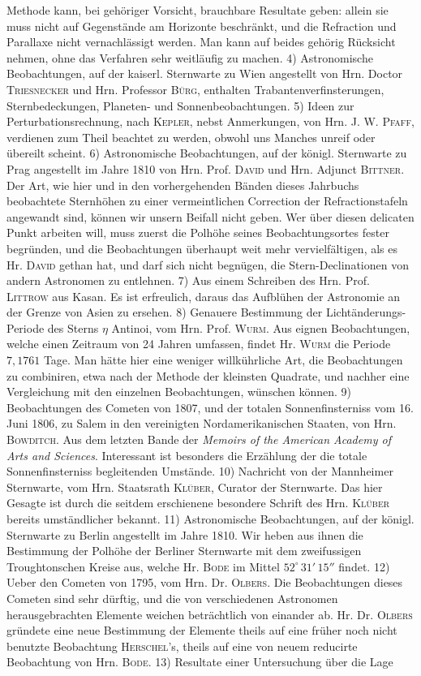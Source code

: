 \noindent Methode kann, bei gehöriger Vorsicht, brauchbare Resultate geben: allein sie muss nicht auf Gegenstände am Horizonte beschränkt, und die Refraction und Parallaxe nicht vernachlässigt werden. Man kann auf beides gehörig Rücksicht nehmen, ohne das Verfahren sehr weitläufig zu machen. 4) Astronomische Beobachtungen, auf der kaiserl. Sternwarte zu Wien angestellt von Hrn. Doctor \textsc{Triesnecker} und Hrn. Professor \textsc{Bürg}, enthalten Trabantenverfinsterungen, Sternbedeckungen, Planeten- und Sonnenbeobachtungen. 5) Ideen zur Perturbationsrechnung, nach \textsc{Kepler}, nebst Anmerkungen, von Hrn. J. W. \textsc{Pfaff}, verdienen zum Theil beachtet zu werden, obwohl uns Manches unreif oder übereilt scheint. 6) Astronomische Beobachtungen, auf der königl. Sternwarte zu Prag angestellt im Jahre 1810 von Hrn. Prof. \textsc{David} und Hrn. Adjunct \textsc{Bittner}. Der Art, wie hier und in den vorhergehenden Bänden dieses Jahrbuchs beobachtete Sternhöhen zu einer vermeintlichen Correction der Refractionstafeln angewandt sind, können wir unsern Beifall nicht geben. Wer über diesen delicaten Punkt arbeiten will, muss zuerst die Polhöhe seines Beobachtungsortes fester begründen, und die Beobachtungen überhaupt weit mehr vervielfältigen, als es Hr. \textsc{David} gethan hat, und darf sich nicht begnügen, die Stern-Declinationen von andern Astronomen zu entlehnen. 7) Aus einem Schreiben des Hrn. Prof. \textsc{Littrow} aus Kasan. Es ist erfreulich, daraus das Aufblühen der Astronomie an der Grenze von Asien zu ersehen. 8) Genauere Bestimmung der Lichtänderungs-Periode des Sterns $\eta$ Antinoi, vom Hrn. Prof. \textsc{Wurm}. Aus eignen Beobachtungen, welche einen Zeitraum von 24 Jahren umfassen, findet Hr. \textsc{Wurm} die Periode $7{,}1761$ Tage. Man hätte hier eine weniger willkührliche Art, die Beobachtungen zu combiniren, etwa nach der Methode der kleinsten Quadrate, und nachher eine Vergleichung mit den einzelnen Beobachtungen, wünschen können. 9) Beobachtungen des Cometen von 1807, und der totalen Sonnenfinsterniss vom 16. Juni 1806, zu Salem in den vereinigten Nordamerikanischen Staaten, von Hrn. \textsc{Bowditch}. Aus dem letzten Bande der \emph{Memoirs of the American Academy of Arts and Sciences}. Interessant ist besonders die Erzählung der die totale Sonnenfinsterniss begleitenden Umstände. 10) Nachricht von der Mannheimer Sternwarte, vom Hrn. Staatsrath \textsc{Klüber}, Curator der Sternwarte. Das hier Gesagte ist durch die seitdem erschienene besondere Schrift des Hrn. \textsc{Klüber} bereits umständlicher bekannt. 11) Astronomische Beobachtungen, auf der königl. Sternwarte zu Berlin angestellt im Jahre 1810. Wir heben aus ihnen die Bestimmung der Polhöhe der Berliner Sternwarte mit dem zweifussigen Troughtonschen Kreise aus, welche Hr. \textsc{Bode} im Mittel $52^\circ\,31'\,15''$ findet. 12) Ueber den Cometen von 1795, vom Hrn. Dr. \textsc{Olbers}. Die Beobachtungen dieses Cometen sind sehr dürftig, und die von verschiedenen Astronomen herausgebrachten Elemente weichen beträchtlich von einander ab. Hr. Dr. \textsc{Olbers} gründete eine neue Bestimmung der Elemente theils auf eine früher noch nicht benutzte Beobachtung \textsc{Herschel}'s, theils auf eine von neuem reducirte Beobachtung von Hrn. \textsc{Bode}. 13) Resultate einer Untersuchung über die Lage 